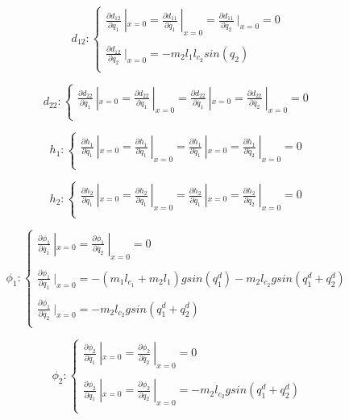 \documentclass[a4paper,12pt]{report}
\begin{document}
$$
d_{12} : \left\{
    \begin{array}{ll}
	\frac{\partial d_{12}}{\partial q_1}\ |_{x=0} = \frac{\partial d_{11}}{\partial \dot{q_1}}\ |_{x=0} = \frac{\partial d_{11}}{\partial \dot{q_2}}\ |_{x=0} = 0 \\
	\ \\
	\frac{\partial d_{12}}{\partial q_2}\ |_{x=0} = -m_2l_1l_{c_2}sin(q_2)\\
    \end{array}
\right.
$$

$$
d_{22} : \left\{
    \begin{array}{ll}
	\frac{\partial d_{22}}{\partial q_1}\ |_{x=0} = \frac{\partial d_{22}}{\partial q_1}\ |_{x=0} = \frac{\partial d_{22}}{\partial \dot{q_1}}\ |_{x=0} = \frac{\partial d_{22}}{\partial \dot{q_2}}\ |_{x=0} = 0 \\
    \end{array}
\right.
$$

$$
h_1 : \left\{
    \begin{array}{ll}
	\frac{\partial h_1}{\partial q_1}\ |_{x=0} = \frac{\partial h_1}{\partial q_1}\ |_{x=0} = \frac{\partial h_1}{\partial \dot{q_1}}\ |_{x=0} = \frac{\partial h_1}{\partial \dot{q_2}}\ |_{x=0} = 0 \\
    \end{array}
\right.
$$

$$
h_2 : \left\{
    \begin{array}{ll}
	\frac{\partial h_2}{\partial q_1}\ |_{x=0} = \frac{\partial h_2}{\partial q_1}\ |_{x=0} = \frac{\partial h_2}{\partial \dot{q_1}}\ |_{x=0} = \frac{\partial h_2}{\partial \dot{q_2}}\ |_{x=0} = 0 \\
    \end{array}
\right.
$$

$$
\phi_1 : \left\{
    \begin{array}{ll}
	\frac{\partial \phi_1}{\partial \dot{q_1}}\ |_{x=0} = \frac{\partial \phi_1}{\partial \dot{q_2}}\ |_{x=0} = 0 \\
	\ \\
	\frac{\partial \phi_1}{\partial q_1}\ |_{x=0} = -(m_1 l_{c_1} + m_2 l_1)g sin(q_1^d) - m_2 l_{c_2} g sin(q_1^d + q_2^d)  \\
	\ \\
	\frac{\partial \phi_1}{\partial \dot{q_2}}\ |_{x=0} = - m_2 l_{c_2} g sin(q_1^d + q_2^d) \\
    \end{array}
\right.
$$


$$
\phi_2 : \left\{
    \begin{array}{ll}
	\frac{\partial \phi_2}{\partial \dot{q_1}}\ |_{x=0} = \frac{\partial \phi_2}{\partial \dot{q_2}}\ |_{x=0} = 0 \\
	\ \\
	\frac{\partial \phi_2}{\partial q_1}\ |_{x=0} = \frac{\partial \phi_2}{\partial q_2}\ |_{x=0} = - m_2 l_{c_2} g sin(q_1^d + q_2^d)  \\
    \end{array}
\right.
$$
\end{document}
